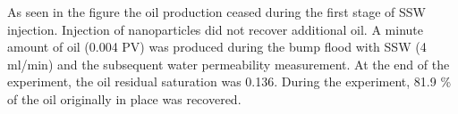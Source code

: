 As seen in the figure the oil production ceased during the first stage of SSW injection. Injection of nanoparticles did not recover additional oil. A minute amount of oil (0.004 PV) was produced during the bump flood with SSW (4 ml/min) and the subsequent water permeability measurement. At the end of the experiment, the oil residual saturation was 0.136. During the experiment, 81.9 \% of the oil originally in place was recovered.

